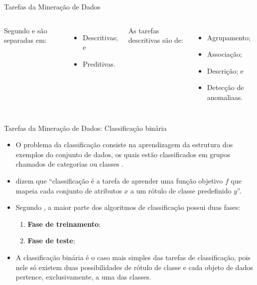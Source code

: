 \documentclass[%
  10pt,%
  aspectratio = 169,%
  compress,%
  t,%
]{beamer}%
\begin{document}
    \begin{frame}[fragile = singleslide]{}{Tarefas da Mineração de Dados}
        \begin{columns}[t]
        Segundo \cite[p.~7]{TanIDM2014} e \cite[p.~15]{Han:2011:DMC:1972541} são separadas em:
        \begin{itemize}
            \item Descritivas; e
            \item Preditivas.
        \end{itemize}

        As tarefas descritivas são de:
        \begin{itemize}
            \item Agrupamento;
            \item Associação;
            \item Descrição; e
            \item Detecção de anomaliaas.
        \end{itemize}

        
        \end{columns}
    \end{frame}

    \begin{frame}[fragile = singleslide]{}{Tarefas da Mineração de Dados: Classificação binária}
        \begin{itemize}
            \item O problema da classificação consiste na aprendizagem da estrutura dos exemplos do conjunto de dados, os quais estão classificados em grupos chamados de categorias ou classes \cite[p.~285]{Aggarwal_DMTT_2015}.

            \item \cite[p.~146, tradução nossa]{TanIDM2014} dizem que ``classificação é a tarefa de aprender uma função objetivo $f$ que mapeia cada conjunto de atributos $x$ a um rótulo de classe predefinido $y$''.

            \item Segundo \cite[p.~286]{Aggarwal_DMTT_2015}, a maior parte dos algoritmos de classificação possui duas fases:
            \begin{enumerate}
                \item \textbf{Fase de treinamento};
                \item \textbf{Fase de teste};
            \end{enumerate}

            \item A classificação binária é o caso mais simples das tarefas de classificação, pois nele só existem duas possibilidades de rótulo de classe e cada objeto de dados pertence, exclusivamente, a uma das classes.
        \end{itemize}
    \end{frame}
\end{document}
